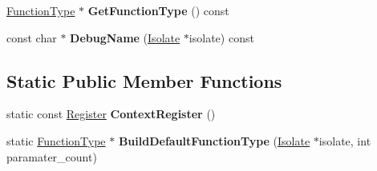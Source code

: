 \begin{DoxyCompactItemize}
\item 
\hyperlink{classv8_1_1internal_1_1_function_type}{Function\+Type} $\ast$ {\bfseries Get\+Function\+Type} () const \hypertarget{classv8_1_1internal_1_1_call_interface_descriptor_ae07c0f53e6c7de34c472ee2b8c0d4ce7}{}\label{classv8_1_1internal_1_1_call_interface_descriptor_ae07c0f53e6c7de34c472ee2b8c0d4ce7}

\item 
const char $\ast$ {\bfseries Debug\+Name} (\hyperlink{classv8_1_1internal_1_1_isolate}{Isolate} $\ast$isolate) const \hypertarget{classv8_1_1internal_1_1_call_interface_descriptor_a1e9ddf39eef59f525be7cbd303a0fbdb}{}\label{classv8_1_1internal_1_1_call_interface_descriptor_a1e9ddf39eef59f525be7cbd303a0fbdb}

\end{DoxyCompactItemize}
\subsection*{Static Public Member Functions}
\begin{DoxyCompactItemize}
\item 
static const \hyperlink{structv8_1_1internal_1_1_register}{Register} {\bfseries Context\+Register} ()\hypertarget{classv8_1_1internal_1_1_call_interface_descriptor_abb2de6679e85ede9b8e8d8b0ca105f98}{}\label{classv8_1_1internal_1_1_call_interface_descriptor_abb2de6679e85ede9b8e8d8b0ca105f98}

\item 
static \hyperlink{classv8_1_1internal_1_1_function_type}{Function\+Type} $\ast$ {\bfseries Build\+Default\+Function\+Type} (\hyperlink{classv8_1_1internal_1_1_isolate}{Isolate} $\ast$isolate, int paramater\+\_\+count)\hypertarget{classv8_1_1internal_1_1_call_interface_descriptor_ab56c35865ef17d7db21c68588411f2b3}{}\label{classv8_1_1internal_1_1_call_interface_descriptor_ab56c35865ef17d7db21c68588411f2b3}

\end{DoxyCompactItemize}
